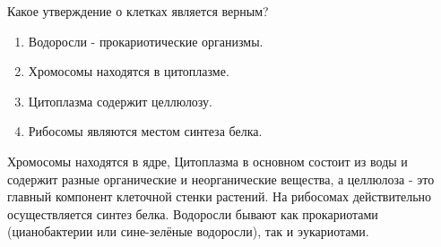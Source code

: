 
Какое утверждение о клетках является верным?

\begin{enumerate}
    \item Водоросли - прокариотические организмы.
    \item Хромосомы находятся в цитоплазме.
    \item Цитоплазма содержит целлюлозу.
    \item Рибосомы являются местом синтеза белка.
\end{enumerate}


\explanationSection

Хромосомы находятся в ядре, Цитоплазма в основном состоит из воды и содержит разные органические и неорганические вещества, а целлюлоза - это главный компонент клеточной стенки растений. На рибосомах действительно осуществляется синтез белка. Водоросли бывают как прокариотами (цианобактерии или сине-зелёные водоросли), так и эукариотами.


